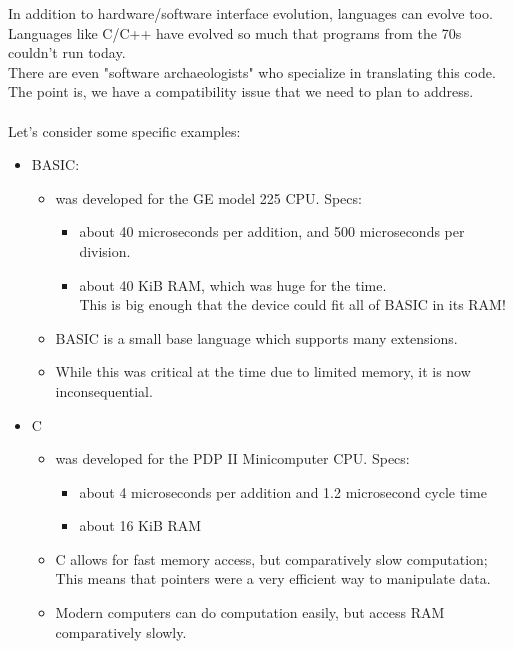 \documentclass[../../lecture_notes.tex]{subfiles}
\begin{document}
\noindent In addition to hardware/software interface evolution, languages can evolve too.\\
Languages like C/C++ have evolved so much that programs from the 70s couldn't run today.\\
There are even "software archaeologists" who specialize in translating this code.\\
The point is, we have a compatibility issue that we need to plan to address.\\
\\
Let's consider some specific examples:
	\begin{itemize} [itemsep=0mm]
		\item BASIC:
			\begin{itemize} [itemsep=0mm]
				\item was developed for the GE model 225 CPU.  Specs:
					\begin{itemize} [itemsep=0mm]
						\item about 40 microseconds per addition, and 500 microseconds per division.
						\item about 40 KiB RAM, which was huge for the time.\\
							This is big enough that the device could fit all of BASIC in its RAM!
					\end{itemize}
				\item BASIC is a small base language which supports many extensions.
				\item While this was critical at the time due to limited memory, it is now inconsequential.
			\end{itemize}
		\item C
			\begin{itemize} [itemsep=0mm]
				\item was developed for the PDP II Minicomputer CPU.  Specs:
					\begin{itemize} [itemsep=0mm]
						\item about 4 microseconds per addition and 1.2 microsecond cycle time
						\item about 16 KiB RAM
					\end{itemize}
				\item C allows for fast memory access, but comparatively slow computation;\\
					This means that pointers were a very efficient way to manipulate data.
				\item Modern computers can do computation easily, but access RAM comparatively slowly.
			\end{itemize}
	\end{itemize}
\end{document}
